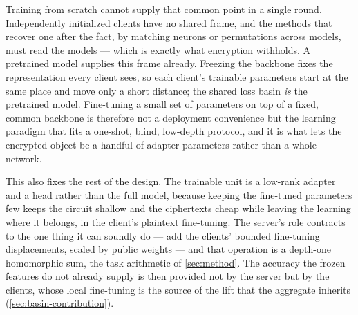 Training from scratch cannot supply that common point in a single round. Independently initialized clients
have no shared frame, and the methods that recover one after the fact, by matching neurons or permutations
across models, must read the models --- which is exactly what encryption withholds. A pretrained model
supplies this frame already. Freezing the backbone fixes the representation every client sees, so each
client's trainable parameters start at the same place and move only a short distance; the shared loss basin
\emph{is} the pretrained model. Fine-tuning a small set of parameters on top of a fixed, common backbone is
therefore not a deployment convenience but the learning paradigm that fits a one-shot, blind, low-depth
protocol, and it is what lets the encrypted object be a handful of adapter parameters rather than a whole
network.

This also fixes the rest of the design. The trainable unit is a low-rank adapter and a head rather than the
full model, because keeping the fine-tuned parameters few keeps the circuit shallow and the ciphertexts cheap
while leaving the learning where it belongs, in the client's plaintext fine-tuning. The server's role
contracts to the one thing it can soundly do --- add the clients' bounded fine-tuning displacements, scaled by
public weights --- and that operation is a depth-one homomorphic sum, the task arithmetic of
\cref{sec:method}. The accuracy the frozen features do not already supply is then provided not by the server
but by the clients, whose local fine-tuning is the source of the lift that the aggregate inherits
(\cref{sec:basin-contribution}).
